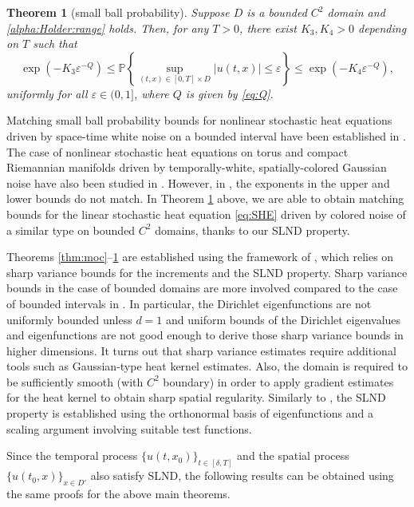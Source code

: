 \documentclass[reqno]{amsart}
\renewcommand{\P}{\mathbb P}
\newcommand{\1}{\mathbf 1}
\numberwithin{equation}{section}
\newtheorem{theorem}{Theorem}[section]
\theoremstyle{definition}
\begin{document}
\begin{theorem}[small ball probability]\label{thm:sbp}
Suppose \(D\) is a bounded \(C^2\) domain and \eqref{alpha:Holder:range} holds. Then, for any $T>0$, there exist \(K_3,K_4>0\) depending on $T$ such that
\[
    \exp\left(-K_3\varepsilon^{-Q}\right)
    \le
    \P\left\{
        \sup_{(t,x)\in [0,T]\times D}|u(t,x)|\le\varepsilon
    \right\}
    \le
    \exp\left(-K_4\varepsilon^{-Q}\right),
\]
uniformly for all \(\varepsilon \in (0, 1]\), where $Q$ is given by \eqref{eq:Q}.
\end{theorem}

Matching small ball probability bounds for nonlinear stochastic heat equations driven by space-time white noise on a bounded interval have been established in \cite{AJM21}.
The case of nonlinear stochastic heat equations on torus and compact Riemannian manifolds driven by temporally-white, spatially-colored Gaussian noise have also been studied in \cite{C24,C25,C26}.
However, in \cite{C24,C25,C26}, the exponents in the upper and lower bounds do not match.
In Theorem \ref{thm:sbp} above, we are able to obtain matching bounds for the linear stochastic heat equation \eqref{eq:SHE} driven by colored noise of a similar type on bounded $C^2$ domains, thanks to our SLND property.

Theorems \ref{thm:moc}--\ref{thm:sbp} are established using the framework of \cite{LX23}, which relies on sharp variance bounds for the increments and the SLND property.
Sharp variance bounds in the case of bounded domains are more involved compared to the case of bounded intervals in \cite{HL26}.
In particular, the Dirichlet eigenfunctions are not uniformly bounded unless $d=1$ and uniform bounds of the Dirichlet eigenvalues and eigenfunctions are not good enough to derive those sharp variance bounds in higher dimensions.
It turns out that sharp variance estimates require additional tools such as Gaussian-type heat kernel estimates.
Also, the domain is required to be sufficiently smooth (with $C^2$ boundary) in order to apply gradient estimates for the heat kernel to obtain sharp spatial regularity.
Similarly to \cite{HL26}, the SLND property is established using the orthonormal basis of eigenfunctions and a scaling argument involving suitable test functions.

Since the temporal process $\{u(t,x_0)\}_{t \in [\delta,T]}$ and the spatial process $\{ u(t_0,x) \}_{x \in D'}$ also satisfy SLND, the following results can be obtained using the same proofs for the above main theorems.
\end{document}
